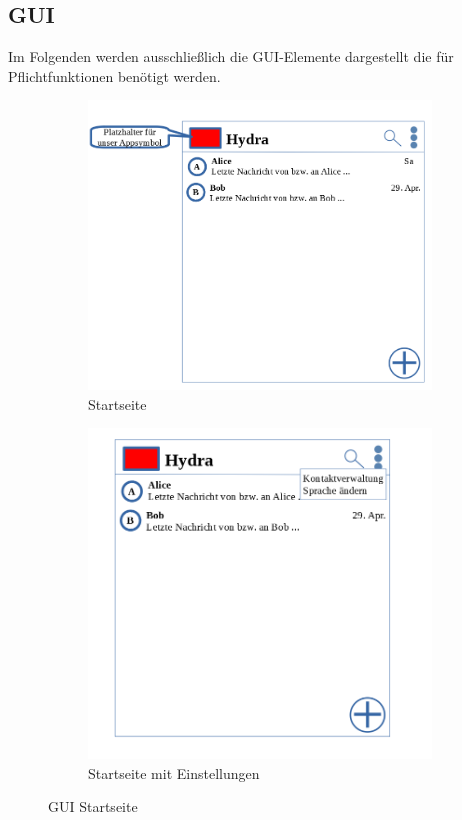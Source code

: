 \subsection{GUI}
\label{kap2_6:GUI}
Im Folgenden werden ausschließlich die \ac{GUI}-Elemente dargestellt die für Pflichtfunktionen benötigt werden.\\


\begin{figure}[h]
\centering
\begin{subfigure}{.5\textwidth}
  \centering
  \includegraphics[scale=0.3]{gui/Startseite.png}
  \caption{Startseite}
\end{subfigure}%
\begin{subfigure}{.5\textwidth}
  \centering
  \includegraphics[scale=0.3]{gui/Startseite_mit_Einstellungen.png}
  \caption{Startseite mit Einstellungen}
\end{subfigure}
\caption{GUI Startseite}
\end{figure}

